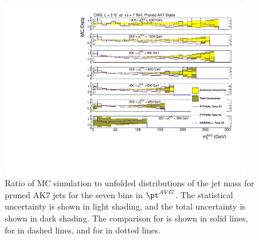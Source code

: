 \begin{figure}[htbp]
\centering
\includegraphics[width=0.95\textwidth]{figs/unfoldedMeasurementDijets_allfrac__Pruned}
\caption{Ratio of MC simulation to unfolded distributions of the jet mass for pruned AK7 jets for the seven bins in $\pt^{AVG}$.
The statistical uncertainty is shown in light shading, and the
total uncertainty is shown in dark shading.
The comparison for \PYTHIA is shown in solid lines, for \PYTHIAEIGHT in dashed lines, and for \HERWIG in dotted lines.
\label{figs:unfoldedMeasurementDijets_allfrac_Pruned}}
\end{figure}









%
